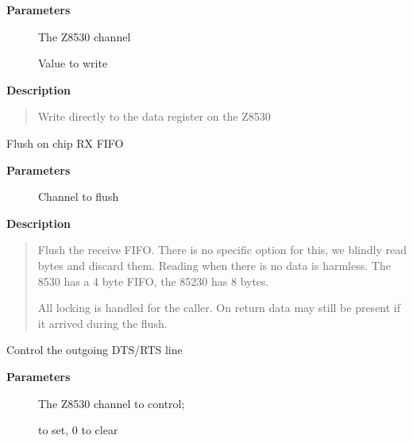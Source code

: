 \documentclass[a4paper,8pt,english]{sphinxmanual}
\begin{document}
\textbf{Parameters}
\begin{description}
\item[{}] \leavevmode
The Z8530 channel

\item[{}] \leavevmode
Value to write

\end{description}

\textbf{Description}
\begin{quote}

Write directly to the data register on the Z8530
\end{quote}

\begin{fulllineitems}
\label{networking/z8530book:c.z8530_flush_fifo}
Flush on chip RX FIFO

\end{fulllineitems}


\textbf{Parameters}
\begin{description}
\item[{}] \leavevmode
Channel to flush

\end{description}

\textbf{Description}
\begin{quote}

Flush the receive FIFO. There is no specific option for this, we
blindly read bytes and discard them. Reading when there is no data
is harmless. The 8530 has a 4 byte FIFO, the 85230 has 8 bytes.

All locking is handled for the caller. On return data may still be
present if it arrived during the flush.
\end{quote}

\begin{fulllineitems}
\label{networking/z8530book:c.z8530_rtsdtr}
Control the outgoing DTS/RTS line

\end{fulllineitems}


\textbf{Parameters}
\begin{description}
\item[{}] \leavevmode
The Z8530 channel to control;

\item[{}]  to set, 0 to clear

\end{description}
\end{document}
